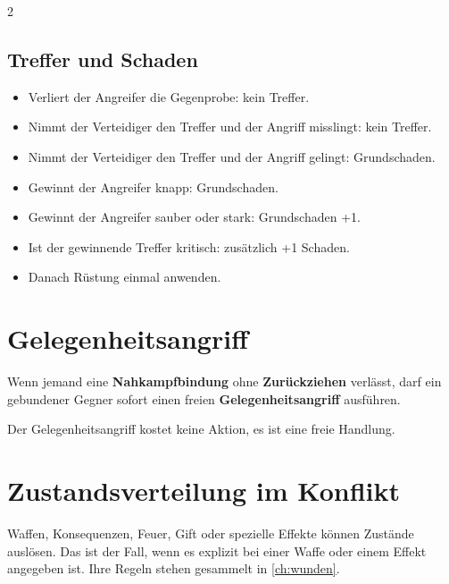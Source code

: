 \begin{multicols*}{2}
\subsection{Treffer und Schaden}\label{subsec:treffer-und-schaden}
\begin{itemize}[leftmargin=*]
\item Verliert der Angreifer die Gegenprobe: kein Treffer.
\item Nimmt der Verteidiger den Treffer und der Angriff misslingt: kein Treffer.
\item Nimmt der Verteidiger den Treffer und der Angriff gelingt: Grundschaden.
\item Gewinnt der Angreifer knapp: Grundschaden.
\item Gewinnt der Angreifer sauber oder stark: Grundschaden +1.
\item Ist der gewinnende Treffer kritisch: zusätzlich +1 Schaden.
\item Danach Rüstung einmal anwenden.
\end{itemize}

\section{Gelegenheitsangriff}\label{sec:parting-strike}

Wenn jemand eine \textbf{Nahkampfbindung} ohne \textbf{Zurückziehen} verlässt, darf ein gebundener Gegner sofort einen freien \textbf{Gelegenheitsangriff} ausführen.

Der Gelegenheitsangriff kostet keine Aktion, es ist eine freie Handlung.

\section{Zustandsverteilung im Konflikt}\label{sec:zustandsverteilung-im-kampf}

Waffen, Konsequenzen, Feuer, Gift oder spezielle Effekte können Zustände auslösen.
Das ist der Fall, wenn es explizit bei einer Waffe oder einem Effekt angegeben ist.
Ihre Regeln stehen gesammelt in \cref{ch:wunden}.

\end{multicols*}
